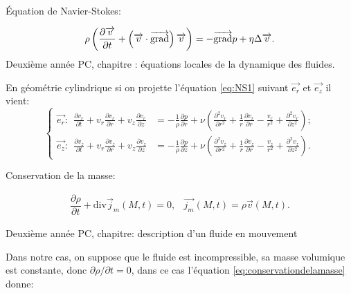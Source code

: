 \documentclass[french, 10pt]{article}
\begin{document}
\begin{Programme}{Équation de Navier-Stokes:}
  
  \begin{equation}
    \rho\left(\dfrac{\partial \vec{v}}{\partial t}+\left(\vec{v}\cdot\vec{\rm grad}\right)\vec{v}\right)=-\vec{\rm grad}p+\eta\Delta\vec{v}.\label{eq:NS1}
  \end{equation}
  Deuxième année PC, chapitre : équations locales de la dynamique des fluides.
\end{Programme}

En géométrie cylindrique si on projette l'équation \eqref{eq:NS1} suivant $\vec{e_r}$ et $\vec{e_z}$ il vient: 
% 
\begin{equation}
  \left\{
    \begin{aligned}
      \vec{e_r}:~~ \frac{\partial v_r}{\partial t} +v_r\frac{\partial v_r}{\partial r} + v_z\frac{\partial v_r}{\partial z}&= -\frac{1}{\rho}\frac{\partial p}{\partial r} + \nu\left(\frac{\partial^2v_r}{\partial r^2}+ \frac{1}{r}\frac{\partial v_r}{\partial r} - \frac{v_r}{r^2}+\frac{\partial ^2 v_r}{\partial z^2}\right);\\
      \vec{e_z}:~~\frac{\partial v_z}{\partial t} +v_r\frac{\partial v_z}{\partial r} + v_z\frac{\partial v_z}{\partial z} &= -\frac{1}{\rho}\frac{\partial p}{\partial z} + \nu\left(\frac{\partial^2v_z}{\partial r^2}+ \frac{1}{r}\frac{\partial v_z}{\partial r} - \frac{v_z}{r^2}+\frac{\partial ^2 v_z}{\partial z^2}\right).\label{eq:NavierStokes}
   \end{aligned}
  \right.
\end{equation}

\begin{Programme}{Conservation de la masse:}
  
  \begin{equation}
    \begin{array}{cc}
   \dfrac{\partial \rho}{\partial t}+\text{div}\vec{j}_m(M,t)=0, & \vec{j_m}(M,t) = \rho \vec{v}(M,t).\label{eq:conservationdelamasse}
    \end{array}
  \end{equation}

  Deuxième année PC, chapitre: description d'un fluide en mouvement
\end{Programme}

Dans notre cas, on suppose que le fluide est incompressible, sa masse volumique est constante, donc $\partial \rho/\partial t = 0$, dans ce cas l'équation \eqref{eq:conservationdelamasse} donne:
\end{document}
